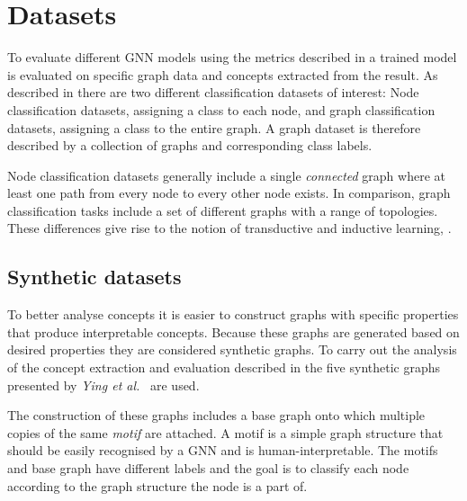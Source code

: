 \section{Datasets}
\label{sec:datasets-theory}


To evaluate different GNN models using the metrics described in  a trained model is evaluated on specific graph data and concepts extracted from the result.
As described in  there are two different classification datasets of interest:
Node classification datasets, assigning a class to each node, and graph classification datasets, assigning a class to the entire graph.
A graph dataset is therefore described by a collection of graphs and corresponding class labels.

Node classification datasets generally include a single \emph{connected} graph where at least one path from every node to every other node exists.
In comparison, graph classification tasks include a set of different graphs with a range of topologies.
These differences give rise to the notion of transductive and inductive learning, .

\subsection{Synthetic datasets}
\label{sec:synth}


To better analyse concepts it is easier to construct graphs with specific properties that produce interpretable concepts.
Because these graphs are generated based on desired properties they are considered synthetic graphs.
To carry out the analysis of the concept extraction and evaluation described in  the five synthetic graphs presented by \textit{Ying et al.}~\cite{ying2019gnnexplainer} are used.

The construction of these graphs includes a base graph onto which multiple copies of the same \emph{motif} are attached.
A motif is a simple graph structure that should be easily recognised by a GNN and is human-interpretable.
The motifs and base graph have different labels and the goal is to classify each node according to the graph structure the node is a part of.

